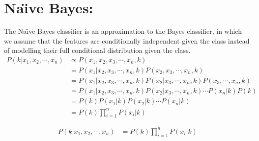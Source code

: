 \documentclass{article}
\begin{document}
\section{Na\"{\i}ve Bayes:}
The Na\"{\i}ve Bayes classifier is an approximation to the Bayes classifier, in which we assume that the features are conditionally independent given the class instead of modelling their full conditional distribution given the class.
\begin{align*} 
P(k|x_1,x_2,\cdots,x_n) &\propto  P(x_1,x_2,x_3,\cdots,x_n,k) \\ 
&=  P(x_1|x_2,x_3,\cdots,x_n,k)P(x_2,x_3,\cdots,x_n,k) \\ 
&= P(x_1|x_2,x_3,\cdots,x_n,k)P(x_2|x_3,\cdots,x_n,k)P(x_3,\cdots,x_n,k) \\
&=  P(x_1|x_2,x_3,\cdots,x_n,k)P(x_2|x_3,\cdots,x_n,k) \cdots P(x_n|k)P(k) \\ 
&=  P(k)P(x_1|k)P(x_2|k) \cdots P(x_n|k) \\
&=  P(k)\prod_{i=1}^{n} P(x_i|k)
\end{align*}

\begin{align*} 
P(k|x_1,x_2,\cdots,x_n) &= P(k)\prod_{i=1}^{n} P(x_i|k)
\end{align*}
\end{document}
